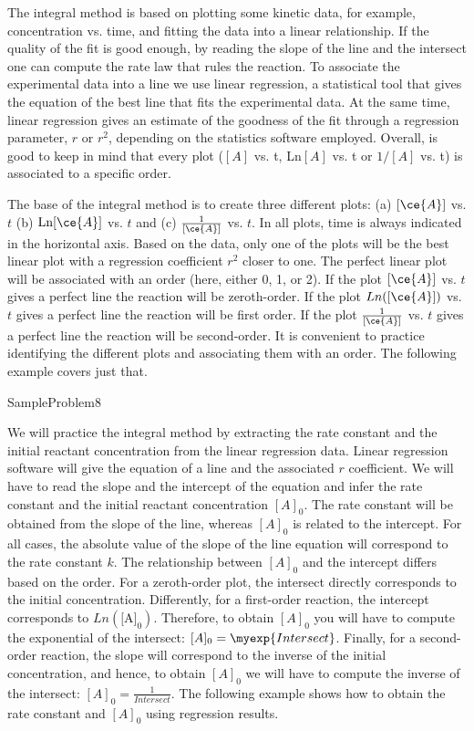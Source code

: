 \documentclass[main.tex]{subfiles}
\begin{document}
\begin{description}
The integral method is based on plotting some kinetic data, for example, concentration vs. time, and fitting the data into a linear relationship.
If the quality of the fit is good enough, by reading the slope of the line and the intersect one can compute the rate law that rules the reaction.
To associate the experimental data into a line we use linear regression, a statistical tool that gives the equation of the best line that fits the experimental data. At the same time, linear regression gives an estimate of the goodness of the fit through a regression parameter, $r$ or $r^2$, depending on the statistics software employed.
Overall, is good to keep in mind that every plot ($[A]$ vs. t, Ln$[A]$ vs. t or $1/[A]$ vs. t) is associated to a specific order.  
\item[\docfilehook{The integral method: associating a linear plot with an order}{}] 
The base of the integral method is to create three different plots: (a) $[\ce{A}]$ vs. $t$ (b) $\text{Ln}[\ce{A}]$ vs. $t$ and (c) $\frac{1}{[\ce{A}]}$ vs. $t$. In all plots, time is always indicated in the horizontal axis. Based on the data, only one of the plots will be the best linear plot with a  regression coefficient $r^2$ closer to one. The perfect linear plot will be associated with an order (here, either 0, 1, or 2). If the plot $[\ce{A}]$ vs. $t$ gives a perfect line the reaction will be zeroth-order. If the plot $Ln([\ce{A}])$ vs. $t$ gives a perfect line the reaction will be first order. If the plot $\frac{1}{[\ce{A}]}$ vs. $t$ gives a perfect line the reaction will be second-order. It is convenient to practice identifying the different plots and associating them with an order. The following example covers just that.

  {SampleProblem8}


\item[\docfilehook{The integral method: extracting data from linear regressions}{}] 
We will practice the integral method by extracting the rate constant and the initial reactant concentration from the linear regression data. Linear regression software will give the equation of a line and the associated $r$ coefficient. We will have to read the slope and the intercept of the equation and infer the rate constant and the initial reactant concentration $[A]_0$.
The rate constant will be obtained from the slope of the line, whereas $[A]_0$ is related to the intercept.
For all cases, the absolute value of the slope of the line equation will correspond to the rate constant $k$. The relationship between $[A]_0$ and the intercept differs based on the order. For a zeroth-order plot, the intersect directly corresponds to the initial concentration. Differently, for a first-order reaction, the intercept corresponds to $Ln(\text{[A]}_0)$. Therefore, to obtain $[A]_0$ you will have to compute the exponential of the intersect: $[A]_0=\myexp{Intersect}$. Finally, for a second-order reaction, the slope will correspond to the inverse of the initial concentration, and hence, to obtain $[A]_0$ we will have to compute the inverse of the intersect: $[A]_0=\frac{1}{Intersect}$. The following example shows how to obtain the rate constant and $[A]_0$ using regression results.


\end{description}
\end{document}
